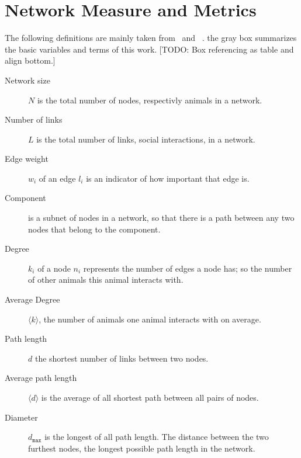 \section{Network Measure and Metrics}
\label{sec:definitions}
The following definitions are mainly taken from~\textcite{barabasi2016network} and ~\textcite{newman2010networks}. the gray box summarizes the basic variables and terms of this work. [TODO: Box referencing as table and align bottom.]

\colorbox{usethiscolorhere}{
\begin{minipage}[!b]{\dimexpr\textwidth-2\fboxsep}%
\vspace{5mm}
\begin{description}
	\item[Network size] $N$ is the total number of nodes, respectivly animals in a network.
	\item[Number of links] $L$ is the total number of links, social interactions, in a network.
	\item[Edge weight] $w_i$ of an edge $l_i$ is an indicator of how important that edge is.
	\item[Component] is a subnet of nodes in a network, so that there is a path between any two nodes that belong to the component.
	\item[Degree] $k_i$ of a node $n_i$ represents the number of edges a node has; so the number of other animals this animal interacts with.	
	\item[Average Degree] $\langle k \rangle$, the number of animals one animal interacts with on average.
	\item[Path length] $d$ the shortest number of links between two nodes.
	\item[Average path length] $\langle d \rangle$ is the average of all shortest path between all pairs of nodes.
	\item[Diameter] $d_{\texttt{max}}$ is the longest of all path length. The distance between the two furthest nodes, the longest possible path length in the network.
\end{description}
\vspace{5mm}
\end{minipage}}


